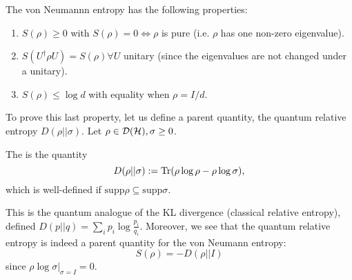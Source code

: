 The von Neumannn entropy has the following properties:
\begin{enumerate}
    \item $S(\rho) \geq 0 $ with $S(\rho)=0 \iff \rho$ is pure (i.e. $\rho$ has one non-zero eigenvalue).
    \item $S(U^\dagger \rho U)=S(\rho) \forall U$ unitary (since the eigenvalues are not changed under a unitary).
    \item $S(\rho) \leq \log d$ with equality when $\rho=I/d$.
\end{enumerate}
To prove this last property, let us define a parent quantity, the quantum relative entropy $D(\rho||\sigma).$ Let $\rho\in \mathcal{D}(\mathcal H), \sigma \geq 0$. 
\begin{defn}
    The  is the quantity
    \begin{equation}
        D(\rho||\sigma) := \operatorname{Tr}(\rho \log \rho - \rho \log \sigma),
    \end{equation}
    which is well-defined if $\text{supp}\rho \subseteq \text{supp}\sigma$.
\end{defn}
This is the quantum analogue of the KL divergence (classical relative entropy), defined $D(p||q)=\sum_i p_i \log \frac{p_i}{q_i}$.
Moreover, we see that the quantum relative entropy is indeed a parent quantity for the von Neumann entropy:
\begin{equation}
    S(\rho)=-D(\rho||I)
\end{equation}
since $\rho\log \sigma|_{\sigma=I}=0$.

